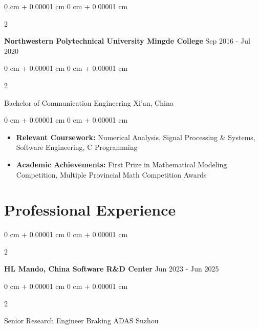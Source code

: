 \documentclass[10pt, a4paper]{article}
\newenvironment{highlights}{
    \begin{itemize}[
        topsep=0.15 cm,
        parsep=0.08 cm,
        partopsep=0pt,
        itemsep=0.05 cm,
        leftmargin=0 cm + 10pt
    ]
}{
    \end{itemize}
} %
\newenvironment{onecolentry}{
    \begin{adjustwidth}{
        0 cm + 0.00001 cm
    }{
        0 cm + 0.00001 cm
    }
}{
    \end{adjustwidth}
} %
\newenvironment{twocolentry}[2][]{
    \onecolentry
    \def\secondColumn{#2}
    \setcolumnwidth{\fill, 4.5 cm}
    \begin{paracol}{2}
}{
    \switchcolumn \raggedleft \secondColumn
    \end{paracol}
    \endonecolentry
} %
\begin{document}
        \vspace{0.2 cm}

        \begin{twocolentry}{
            Sep 2016 - Jul 2020
        }
            \textbf{Northwestern Polytechnical University Mingde College}\end{twocolentry}

        \begin{twocolentry}{
            Xi'an, China
        }
            Bachelor of Communication Engineering\end{twocolentry}

        \vspace{0.10 cm}
        \begin{onecolentry}
            \begin{highlights}
                \item \textbf{Relevant Coursework:} Numerical Analysis, Signal Processing \& Systems, Software Engineering, C Programming
                \item \textbf{Academic Achievements:} First Prize in Mathematical Modeling Competition, Multiple Provincial Math Competition Awards
            \end{highlights}
        \end{onecolentry}



    
    \section{Professional Experience}

        \begin{twocolentry}{
            Jun 2023 - Jun 2025
        }
            \textbf{HL Mando, China Software R\&D Center}\end{twocolentry}

        \begin{twocolentry}{
            Suzhou
        }
            Senior Research Engineer Braking ADAS\end{twocolentry}
\end{document}
